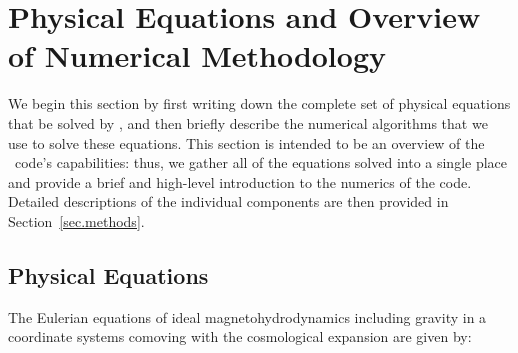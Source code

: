 

\section{Physical Equations and Overview of Numerical Methodology}
\label{sec.overview}

We begin this section by first writing down the complete set of
physical equations that be solved by \enzo, and then briefly describe
the numerical algorithms that we use to solve these equations.  This
section is intended to be an overview of the \enzo\ code's
capabilities: thus, we gather all of the equations solved into a
single place and provide a brief and high-level introduction to the
numerics of the code.  Detailed descriptions of the individual
components are then provided in Section~\ref{sec.methods}.


\subsection{Physical Equations}




The Eulerian equations of ideal magnetohydrodynamics including gravity
in a coordinate systems comoving with the cosmological expansion are
given by:

